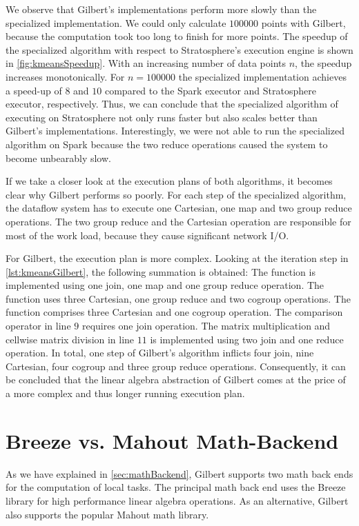 We observe that Gilbert's \kmeans implementations perform more slowly than the specialized implementation.
We could only calculate $100000$ points with Gilbert, because the computation took too long to finish for more points.
The speedup of the specialized algorithm with respect to Stratosphere's execution engine is shown in \cref{fig:kmeansSpeedup}.
With an increasing number of data points $n$, the speedup increases monotonically.
For $n=100000$ the specialized implementation achieves a speed-up of $8$ and $10$ compared to the Spark executor and Stratosphere executor, respectively.
Thus, we can conclude that the specialized algorithm of \kmeans executing on Stratosphere not only runs faster but also scales better than Gilbert's implementations.
Interestingly, we were not able to run the specialized algorithm on Spark because the two reduce operations caused the system to become unbearably slow.

If we take a closer look at the execution plans of both algorithms, it becomes clear why Gilbert performs so poorly.
For each step of the specialized algorithm, the dataflow system has to execute one Cartesian, one map and two group reduce operations.
The two group reduce and the Cartesian operation are responsible for most of the work load, because they cause significant network I/O.

For Gilbert, the execution plan is more complex.
Looking at the iteration step in \cref{lst:kmeansGilbert}, the following summation is obtained:
The  function is implemented using one join, one map and one group reduce operation.
The  function uses three Cartesian, one group reduce and two cogroup operations.
The  function comprises three Cartesian and one cogroup operation.
The comparison operator in line $9$ requires one join operation.
The matrix multiplication and cellwise matrix division in line $11$ is implemented using two join and one reduce operation.
In total, one step of Gilbert's \kmeans algorithm inflicts four join, nine Cartesian, four cogroup and three group reduce operations.
Consequently, it can be concluded that the linear algebra abstraction of Gilbert comes at the price of a more complex and thus longer running execution plan.

\section{Breeze vs. Mahout Math-Backend}

As we have explained in \cref{sec:mathBackend}, Gilbert supports two math back ends for the computation of local tasks.
The principal math back end uses the Breeze library for high performance linear algebra operations.
As an alternative, Gilbert also supports the popular Mahout math library.

